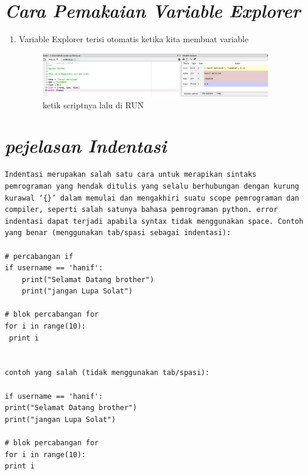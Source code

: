 \section*{\textit{Cara Pemakaian Variable Explorer}}
\begin{enumerate}
\item Variable Explorer terisi otomatis ketika kita membuat variable
		\begin{figure}[h]
			\includegraphics[width=10cm]{figure/variabel.png}
			\centering
			\caption{ketik scriptnya lalu di RUN}
			\end{figure}
\end{enumerate}

\section*{\textit{pejelasan Indentasi}}
\begin{verbatim}
Indentasi merupakan salah satu cara untuk merapikan sintaks pemrograman yang hendak ditulis yang selalu berhubungan dengan kurung kurawal ‘{}’ dalam memulai dan mengakhiri suatu scope pemrograman dan compiler, seperti salah satunya bahasa pemrograman python. error indentasi dapat terjadi apabila syntax tidak menggunakan space. Contoh yang benar (menggunakan tab/spasi sebagai indentasi):

# percabangan if
if username == 'hanif':
	print("Selamat Datang brother")
	print("jangan Lupa Solat")
	
# blok percabangan for
for i in range(10):
 print i
 

contoh yang salah (tidak menggunakan tab/spasi):

if username == 'hanif':
print("Selamat Datang brother")
print("jangan Lupa Solat")
	
# blok percabangan for
for i in range(10):
print i
\end{verbatim}

